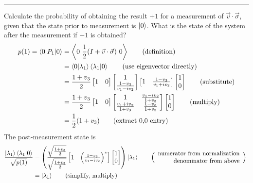 \vspace{5pt}
\hrule
\vspace{5pt}
 Calculate the probability of obtaining the result $+1$ for a measurement of $\vec{v}\cdot\vec{\sigma}$, given that the state prior to measurement is $\ket{0}$.  What is the state of the system after the measurement if $+1$ is obtained?
\Soln 
\begin{align*}
	p(1) = \braket{0|P_1|0} &= \left\langle 0 \Big\lvert \frac{1}{2} ( I + \vec{v} \cdot \vec{\sigma} ) \Big\rvert 0\right\rangle \tag{definition}\\
	           &= \braket{0|\lambda_1}\braket{\lambda_1|0} \tag{use eigenvector directly}\\
	           &=\frac{1+v_3}{2}\begin{bmatrix}1&0\end{bmatrix}\begin{bmatrix}1 \\ \frac{1-v_3}{v_1-iv_2}\end{bmatrix}\begin{bmatrix}1 & \frac{1-v_3}{v_1+iv_2}\end{bmatrix}\begin{bmatrix}1\\0\end{bmatrix} \tag{substitute}\\
	           &= \frac{1+v_3}{2}\begin{bmatrix}1&0\end{bmatrix} \begin{bmatrix}
    	 1 & \frac{v_1 - iv_2}{1 + v_3} \\
    	 \frac{v_1 + iv_2}{1 + v_3} & \frac{1-v_3}{1+v_3}
	 \end{bmatrix}\begin{bmatrix}1\\0\end{bmatrix} \tag{multiply}\\
		&= \frac{1}{2} (1 + v_3) \tag{extract 0,0 entry}
\end{align*}
The post-measurement state is
\begin{align*} \frac{\ket{\lambda_1}\braket{\lambda_1|0}}{\sqrt{p(1)}} &=\left(\frac{\sqrt{\frac{1+v_3}{2}}}{\sqrt{\frac{1+v_3}{2}}}\begin{bmatrix}1 & \left(\frac{1-v_3}{v_1-iv_2}\right)^*\end{bmatrix}\begin{bmatrix}1\\0\end{bmatrix}\right) \ket{\lambda_1} \tag*{$\Bigl(\Bigr. \begin{array}{r}\text{numerator from normalization}\\ \text{denominator from above}\end{array} \Bigl.\Bigr)$ } \\
&= \ket{\lambda_1} \tag{simplify, multiply}
\end{align*}
